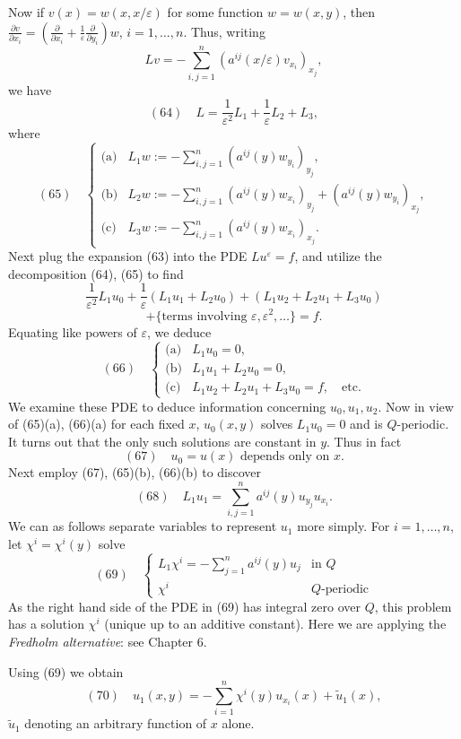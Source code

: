 \begin{example}
Now if $v(x) = w(x, x/\varepsilon)$ for some function $w = w(x, y)$, then $\frac{\partial v}{\partial x_i} = \left(\frac{\partial}{\partial x_i} + \frac{1}{\varepsilon} \frac{\partial}{\partial y_i}\right) w$, $i = 1, \ldots, n$. Thus, writing
$$Lv = -\sum_{i,j=1}^n (a^{ij}(x/\varepsilon)v_{x_i})_{x_j},$$
we have
$$(64) \quad L = \frac{1}{\varepsilon^2} L_1 + \frac{1}{\varepsilon} L_2 + L_3,$$
where
$$(65) \quad \begin{cases}
\text{(a)} & L_1 w := -\sum_{i,j=1}^n (a^{ij}(y) w_{y_i})_{y_j}, \\
\text{(b)} & L_2 w := -\sum_{i,j=1}^n (a^{ij}(y) w_{x_i})_{y_j} + (a^{ij}(y) w_{y_i})_{x_j}, \\
\text{(c)} & L_3 w := -\sum_{i,j=1}^n (a^{ij}(y) w_{x_i})_{x_j}.
\end{cases}$$
Next plug the expansion (63) into the PDE $Lu^\varepsilon = f$, and utilize the decomposition (64), (65) to find
$$\frac{1}{\varepsilon^2} L_1 u_0 + \frac{1}{\varepsilon}(L_1 u_1 + L_2 u_0) + (L_1 u_2 + L_2 u_1 + L_3 u_0)$$
$$+ \{\text{terms involving } \varepsilon, \varepsilon^2, \ldots\} = f.$$
Equating like powers of $\varepsilon$, we deduce
$$(66) \quad \begin{cases}
\text{(a)} & L_1 u_0 = 0, \\
\text{(b)} & L_1 u_1 + L_2 u_0 = 0, \\
\text{(c)} & L_1 u_2 + L_2 u_1 + L_3 u_0 = f, \quad \text{etc.}
\end{cases}$$
We examine these PDE to deduce information concerning $u_0, u_1, u_2$. Now in view of (65)(a), (66)(a) for each fixed $x$, $u_0(x, y)$ solves $L_1 u_0 = 0$ and is $Q$-periodic. It turns out that the only such solutions are constant in $y$. Thus in fact
$$(67) \quad u_0 = u(x) \text{ depends only on } x.$$
Next employ (67), (65)(b), (66)(b) to discover
$$(68) \quad L_1 u_1 = \sum_{i,j=1}^n a^{ij}(y)u_{y_j} u_{x_i}.$$
We can as follows separate variables to represent $u_1$ more simply. For $i = 1, \ldots, n$, let $\chi^i = \chi^i(y)$ solve
$$(69) \quad \begin{cases} L_1 \chi^i = -\sum_{j=1}^n a^{ij}(y)u_j & \text{in } Q \\ \chi^i & Q\text{-periodic} \end{cases}$$
As the right hand side of the PDE in (69) has integral zero over $Q$, this problem has a solution $\chi^i$ (unique up to an additive constant). Here we are applying the \textit{Fredholm alternative}: see Chapter 6.

Using (69) we obtain
$$(70) \quad u_1(x, y) = -\sum_{i=1}^n \chi^i(y)u_{x_i}(x) + \tilde{u}_1(x),$$
$\tilde{u}_1$ denoting an arbitrary function of $x$ alone.


\end{example}
